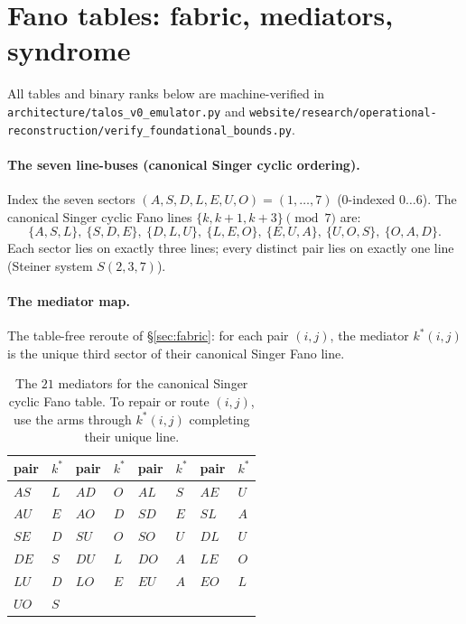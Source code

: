 \section{Fano tables: fabric, mediators, syndrome}
\label{app:fano}

All tables and binary ranks below are machine-verified in
\texttt{architecture/talos\_v0\_emulator.py} and
\texttt{website/research/operational-reconstruction/verify\_foundational\_bounds.py}.

\paragraph{The seven line-buses (canonical Singer cyclic ordering).}
Index the seven sectors $(A,S,D,L,E,U,O)=(1,\dots,7)$ (0-indexed $0\dots 6$).
The canonical Singer cyclic Fano lines $\{k,k{+}1,k{+}3\}\pmod 7$ are:
\[
\{A,S,L\},\ \{S,D,E\},\ \{D,L,U\},\ \{L,E,O\},\ \{E,U,A\},\ \{U,O,S\},\ \{O,A,D\}.
\]
Each sector lies on exactly three lines; every distinct pair lies on exactly one
line (Steiner system $S(2,3,7)$).

\paragraph{The mediator map.} The table-free reroute of \S\ref{sec:fabric}:
for each pair $(i,j)$, the mediator $k^\ast(i,j)$ is the unique third sector of
their canonical Singer Fano line.

\begin{table}[H]
\centering\small
\begin{tabular}{@{}llll llll@{}}
\toprule
pair & $k^\ast$ & pair & $k^\ast$ & pair & $k^\ast$ & pair & $k^\ast$ \\
\midrule
$AS$ & $L$ & $AD$ & $O$ & $AL$ & $S$ & $AE$ & $U$ \\
$AU$ & $E$ & $AO$ & $D$ & $SD$ & $E$ & $SL$ & $A$ \\
$SE$ & $D$ & $SU$ & $O$ & $SO$ & $U$ & $DL$ & $U$ \\
$DE$ & $S$ & $DU$ & $L$ & $DO$ & $A$ & $LE$ & $O$ \\
$LU$ & $D$ & $LO$ & $E$ & $EU$ & $A$ & $EO$ & $L$ \\
$UO$ & $S$ &      &     &      &     &      &     \\
\bottomrule
\end{tabular}
\caption{The $21$ mediators for the canonical Singer cyclic Fano table. To
repair or route $(i,j)$, use the arms through $k^\ast(i,j)$ completing their
unique line.}
\end{table}

